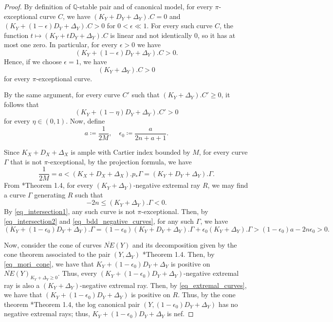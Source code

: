 \documentclass{amsart}
\newcommand{\bQ}{\mathbb{Q}}
\theoremstyle{definition}
\begin{document}
\begin{proof}
By definition of $\bQ$-stable pair and of canonical model,
for every $\pi$-exceptional curve $C$, we have $(K_Y+D_Y+\Delta_Y).C=0$ and $(K_Y+(1-\epsilon)D_Y+\Delta_Y).C>0$ for $0 < \epsilon \ll 1$.
For every such curve $C$, the function $t\mapsto (K_Y+tD_Y+\Delta_Y).C$ is linear and not identically 0, so it has at most one zero. 
In particular, for every $\epsilon >0$ we have 
\begin{equation} \label{eq_intersection0}
(K_Y+(1-\epsilon)D_Y+\Delta_Y).C>0.    
\end{equation}
Hence, if we choose $\epsilon =1$, we have
\begin{equation} \label{eq_intersection1}
(K_Y+\Delta_Y).C>0
\end{equation}
for every $\pi$-exceptional curve.

By the same argument, for every curve $C'$ such that $(K_Y + \Delta_Y).C' \geq 0$, it follows that
\begin{equation} \label{eq_mori_cone}
    (K_Y  + (1-\eta) D_Y + \Delta_Y).C' >0
\end{equation}
for every $\eta \in (0,1)$.
Now, define
\[
a\coloneqq \frac{1}{2M},\quad \epsilon_0 \coloneqq \displaystyle{\frac{a}{2n+a+1}}.
\]



Since $K_X+D_X+\Delta_X$ is ample with Cartier index bounded by $M$, for every curve $\Gamma$ that is not $\pi$-exceptional,
by the projection formula, we have
\begin{equation} \label{eq_intersection2}
\frac{1}{2M} = a<(K_X+D_X+\Delta_X).p_*\Gamma = (K_Y+D_Y+\Delta_Y).\Gamma.
\end{equation}
From \cite{Fuj11}*{Theorem 1.4}, for every $(K_Y+\Delta_Y)$-negative extremal ray $R$, we may find a curve $\Gamma$ generating $R$ such that
\begin{equation} \label{eq_bdd_negative_curves}
-2n\le (K_Y+\Delta_Y).\Gamma<0.
\end{equation}
By \eqref{eq_intersection1}, any such curve is not $\pi$-exceptional.
Then, by \eqref{eq_intersection2} and \eqref{eq_bdd_negative_curves}, for any such $\Gamma$, we have
\begin{equation} \label{eq_extremal_curves}
    (K_Y + (1-\epsilon_0)D_Y + \Delta_Y).\Gamma= (1-\epsilon_0)(K_Y + D_Y + \Delta_Y).\Gamma + \epsilon_0 (K_Y + \Delta_Y).\Gamma>(1-\epsilon_0)a-2n\epsilon_0 > 0.
\end{equation}


Now, consider the cone of curves $\overline{NE}(Y)$ and its decomposition given by the cone theorem associated to the pair $(Y,\Delta_Y)$ \cite{Fuj11}*{Theorem 1.4}.
Then, by \eqref{eq_mori_cone}, we have that $K_Y + (1-\epsilon_0)D_Y + \Delta_Y$ is positive on $\overline{NE}(Y)_{K_Y + \Delta_Y \geq 0}$.
Thus, every $(K_Y + (1-\epsilon_0)D_Y + \Delta_Y)$-negative extremal ray is also a $(K_Y +  \Delta_Y)$-negative extremal ray.
Then, by \eqref{eq_extremal_curves}, we have that $(K_Y + (1-\epsilon_0)D_Y + \Delta_Y)$ is positive on $R$.
Thus, by the cone theorem \cite{Fuj11}*{Theorem 1.4}, the log canonical pair $(Y,(1-\epsilon_0)D_Y + \Delta_Y)$ has no negative extremal rays; thus, $K_Y + (1-\epsilon_0)D_Y + \Delta_Y$ is nef.


\end{proof}
\end{document}

